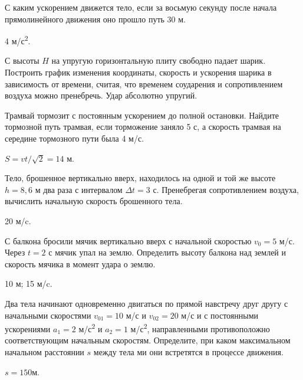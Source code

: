 \begin{ex} %
С каким ускорением движется тело, если за восьмую секунду после начала прямолинейного движения оно прошло путь 30 м.
\begin{ans}
4 м/с\textsuperscript{2}.
\end{ans}
\end{ex}

\begin{ex} %
С высоты $H$ на упругую горизонтальную плиту свободно падает шарик. Построить график изменения координаты, скорость и ускорения шарика в зависимость от времени, считая, что временем соударения и сопротивлением воздуха можно пренебречь. Удар абсолютно упругий.
\end{ex}

\begin{ex} %
Трамвай тормозит с постоянным ускорением до полной остановки. Найдите тормозной путь трамвая, если торможение заняло 5 с, а скорость трамвая на середине тормозного пути была 4 м/с.
\begin{ans}
$S = vt/\sqrt{2} = 14$ м.
\end{ans}
\end{ex}

\begin{ex} %
Тело, брошенное вертикально вверх, находилось на одной и той же высоте $h = 8,6$ м два раза с интервалом $\Delta t = 3$ с. Пренебрегая сопротивлением воздуха, вычислить начальную скорость брошенного тела.
\begin{ans}
20 м/c.
\end{ans}
\end{ex}

\begin{ex} %
С балкона бросили мячик вертикально вверх с начальной скоростью $v_0 = 5$ м/с. Через $t = 2$ с мячик упал на землю. Определить высоту балкона над землей и скорость мячика в момент удара о землю.
\begin{ans}
10 м; 15 м/c.
\end{ans}
\end{ex}

\begin{ex} %
Два тела начинают одновременно двигаться по прямой навстречу друг другу с начальными скоростями $v_{01} = 10$ м/с и $v_{02} = 20$ м/с и с постоянными ускорениями $a_1 = 2$ м/с\textsuperscript{2} и $a_2 = 1$ м/с\textsuperscript{2}, направленными противоположно соответствующим начальным скоростям. Определите, при каком максимальном начальном расстоянии $s$ между тела ми они встретятся в процессе движения.
\begin{ans}
$s = 150 м$.
\end{ans}
\end{ex}

